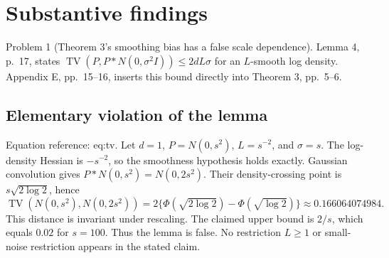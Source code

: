 \documentclass[10pt]{article}
\begin{document}
\section*{Substantive findings}
Problem 1 (Theorem 3’s smoothing bias has a false scale dependence).  Lemma 4, p. 17, states \(\operatorname{TV}(P,P*N(0,\sigma^2I))\le2dL\sigma\) for an \(L\)-smooth log density. Appendix E, pp. 15–16, inserts this bound directly into Theorem 3, pp. 5–6.\par
\subsection*{Elementary violation of the lemma}
Equation reference: eq:tv. Let \(d=1\), \(P=N(0,s^2)\), \(L=s^{-2}\), and \(\sigma=s\). The log-density Hessian is \(-s^{-2}\), so the smoothness hypothesis holds exactly. Gaussian convolution gives \(P*N(0,s^2)=N(0,2s^2)\). Their density-crossing point is \(s\sqrt{2\log2}\), hence \[
\operatorname{TV}(N(0,s^2),N(0,2s^2))
=2\{\Phi(\sqrt{2\log2})-\Phi(\sqrt{\log2})\}
\approx0.166064074984 .\] This distance is invariant under rescaling. The claimed upper bound is \(2/s\), which equals \(0.02\) for \(s=100\). Thus the lemma is false. No restriction \(L\ge1\) or small-noise restriction appears in the stated claim.\par
\end{document}
